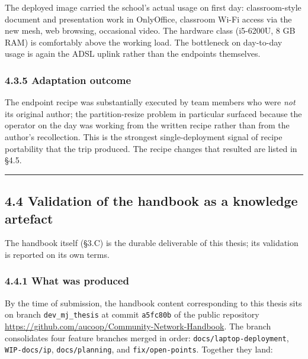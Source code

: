 The deployed image carried the school's actual usage on first day:
classroom-style document and presentation work in OnlyOffice, classroom
Wi-Fi access via the new mesh, web browsing, occasional video. The
hardware class (i5-6200U, 8 GB RAM) is comfortably above the working
load. The bottleneck on day-to-day usage is again the ADSL uplink rather
than the endpoints themselves.

\hypertarget{adaptation-outcome-1}{%
\subsubsection{4.3.5 Adaptation outcome}\label{adaptation-outcome-1}}

The endpoint recipe was substantially executed by team members who were
\emph{not} its original author; the partition-resize problem in
particular surfaced because the operator on the day was working from the
written recipe rather than from the author's recollection. This is the
strongest single-deployment signal of recipe portability that the trip
produced. The recipe changes that resulted are listed in §4.5.

\begin{center}\rule{0.5\linewidth}{0.5pt}\end{center}

\hypertarget{validation-of-the-handbook-as-a-knowledge-artefact}{%
\subsection{4.4 Validation of the handbook as a knowledge
artefact}\label{validation-of-the-handbook-as-a-knowledge-artefact}}

The handbook itself (§3.C) is the durable deliverable of this thesis;
its validation is reported on its own terms.

\hypertarget{what-was-produced}{%
\subsubsection{4.4.1 What was produced}\label{what-was-produced}}

By the time of submission, the handbook content corresponding to this
thesis sits on branch \texttt{dev\_mj\_thesis} at commit
\texttt{a5fc80b} of the public repository
\url{https://github.com/aucoop/Community-Network-Handbook}. The branch
consolidates four feature branches merged in order:
\texttt{docs/laptop-deployment}, \texttt{WIP-docs/ip},
\texttt{docs/planning}, and \texttt{fix/open-points}. Together they
land:

